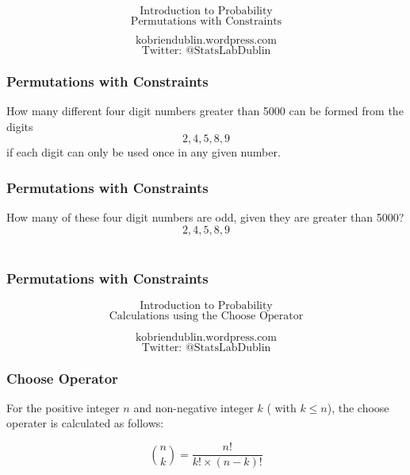 \documentclass{beamer}
\begin{document}
\begin{frame}
\Huge
\[\mbox{Introduction to Probability}\]
\LARGE
\[\mbox{Permutations with Constraints}\]

\Large
\[\mbox{kobriendublin.wordpress.com}\]
\[\mbox{Twitter: @StatsLabDublin}\]

\end{frame}

\begin{frame}
\frametitle{Permutations with Constraints}
\Large
\vspace{-2cm}
How many different four digit numbers greater than 5000 can be formed from the digits \[2,4,5,8,9\] if each digit can only be used once in any given number.
\\

 

\end{frame}

\begin{frame}
\frametitle{Permutations with Constraints}
\Large
\vspace{-3cm}
How many of these four digit numbers are odd, given they are greater than 5000?
\[2,4,5,8,9\]\\

\end{frame}


\begin{frame}
\frametitle{Permutations with Constraints}
\Large


\end{frame}

 
 
 
\begin{frame}
\Huge
\[\mbox{Introduction to Probability}\]
\LARGE
\[\mbox{Calculations using the Choose Operator}\]

\Large
\[\mbox{kobriendublin.wordpress.com}\]
\[\mbox{Twitter: @StatsLabDublin}\]

\end{frame}

\begin{frame}
\frametitle{Choose Operator}
\Large
For the positive integer $n$ and non-negative integer $k$ ( with $k\leq n$), the choose operater is calculated as follows:

\[ {n \choose k} = \frac{n!}{k! \times (n-k)!} \]

\end{frame}
\end{document}
